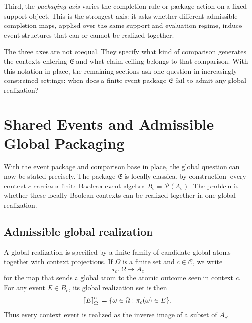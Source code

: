 \documentclass[11pt]{article}
\newcommand{\EventPackage}{\mathfrak{E}}
\newcommand{\llbracket}{\mathopen{[\mkern-3mu[}}
\newcommand{\rrbracket}{\mathclose{]\mkern-3mu]}}
\theoremstyle{definition}
\begin{document}
Third, the \emph{packaging axis} varies the completion rule or package action on a fixed support object. This is the strongest axis: it asks whether different admissible completion maps, applied over the same support and evaluation regime, induce event structures that can or cannot be realized together.

The three axes are not coequal. They specify what kind of comparison generates the contexts entering \(\EventPackage\) and what claim ceiling belongs to that comparison. With this notation in place, the remaining sections ask one question in increasingly constrained settings: when does a finite event package \(\EventPackage\) fail to admit any global realization?

\section{Shared Events and Admissible Global Packaging}\label{sec:global-packaging}
With the event package and comparison base in place, the global question can now be stated precisely. The package \(\EventPackage\) is locally classical by construction: every context \(c\) carries a finite Boolean event algebra \(B_c=\mathcal P(A_c)\). The problem is whether these locally Boolean contexts can be realized together in one global realization.

\subsection{Admissible global realization}

A global realization is specified by a finite family of candidate global atoms together with context projections. If \(\Omega\) is a finite set and \(c\in\mathcal C\), we write
\[
\pi_c : \Omega \to A_c
\]
for the map that sends a global atom to the atomic outcome seen in context \(c\). For any event \(E\in B_c\), its global realization set is then
\[
\llbracket E \rrbracket_\Omega^c := \{\omega\in\Omega : \pi_c(\omega)\in E\}.
\]
Thus every context event is realized as the inverse image of a subset of \(A_c\).
\end{document}
